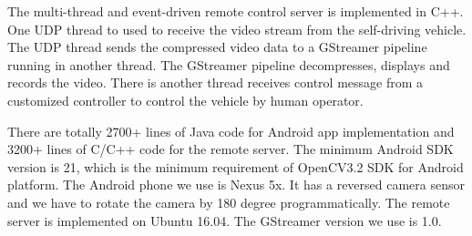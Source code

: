 The multi-thread and event-driven remote control 
server is implemented in C++.  
One UDP thread to used to receive the video stream from the
self-driving vehicle. 
The UDP thread sends the compressed video data to a GStreamer
pipeline \cite{gstreamer} running in another thread. 
The GStreamer pipeline decompresses, displays and records the video.   
There is another thread receives control message from a customized
controller to control the vehicle by human operator.


There are totally 2700+ lines of Java code for Android app implementation
and 3200+ lines of C/C++ code for the remote server.
The minimum Android SDK version is 21, which is the minimum requirement
of OpenCV3.2 SDK for Android platform. 
The Android phone we use is Nexus 5x. 
It has a reversed camera sensor and we have to rotate the camera by 180 degree
programmatically. 
The remote server is implemented on Ubuntu 16.04. 
The GStreamer version we use is 1.0. 

